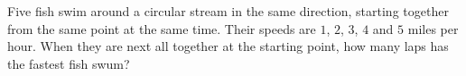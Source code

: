 Five fish swim around a circular stream in the same direction, starting together from the same point at the same time. Their speeds are $1$, $2$, $3$, $4$ and $5$ miles per hour. When they are next all together at the starting point, how many laps has the fastest fish swum?
